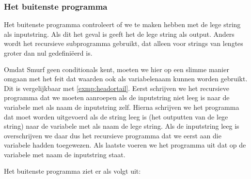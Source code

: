\subsubsection{Het buitenste programma}
Het buitenste programma controleert of we te maken hebben met de lege string
als inputstring. Als dit het geval is geeft het de lege string als output.
Anders wordt het recursieve subprogramma gebruikt, dat alleen voor strings van
lengtes groter dan nul gedefini\"{e}erd is.

Omdat Smurf geen conditionals kent, moeten we hier op een slimme manier omgaan
met het feit dat waarden ook als variabelenaam kunnen worden gebruikt. Dit is
vergelijkbaar met \autoref{exmp:headortail}. Eerst schrijven we het recursieve
programma dat we moeten aanroepen als de inputstring niet leeg is naar de
variabele met als naam de inputstring zelf. Hierna schrijven we het programma
dat moet worden uitgevoerd als de string leeg is (het outputten van de lege
string) naar de variabele met als naam de lege string. Als de inputstring leeg
is overschrijven we daar dus het recursieve programma dat we eerst aan die
variabele hadden toegewezen. Als laatste voeren we het programma uit dat op de
variabele met naam de inputstring staat.

Het buitenste programma ziet er als volgt uit:
\begin{center}
\end{center}

